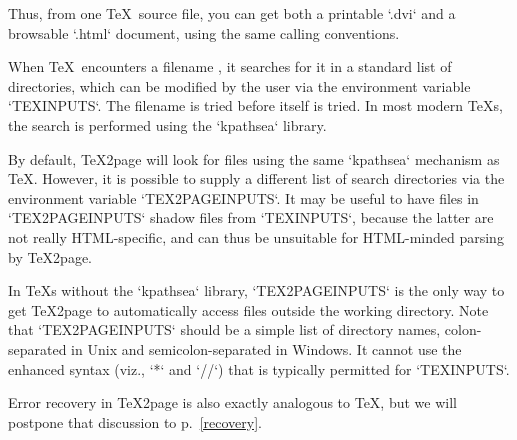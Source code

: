 Thus, from one \TeX\ source file, you can get both a printable `.dvi` and a
browsable `.html` document, using the same calling
conventions.\iffalse \f{Quite a few documents profit from
being available additionally as plain text, either as a man page, or as
tagged text on a general-purpose text editor, instead of requiring an HTML
browser.  The scripts `t2p2man`,
`t2p2txt`, and `t2p2info`, included in the \TeX2page distribution,
help accomplish this.
Each of these scripts takes as argument the main HTML
file \p{|meta[jobname].html} created by \TeX2page, and generate the
corresponding man page \p{|meta[jobname].1},
the Vim help file \p{|meta[jobname].txt}, and the
Info file
\p{|meta[jobname].info}
respectively.  While the man page is always a single page, the Info and
Vim-help output is composed of multiple files if the HTML document contains
pagebreaks.}\fi



When \TeX\ encounters a filename , it
searches for it
in a standard list of
directories, which can be modified by the user via the
environment variable `TEXINPUTS`.
The filename  is tried before
 itself is tried.  In most modern \TeX s, the
search is performed using the `kpathsea` library.

By default, \TeX2page will look for files using the same `kpathsea`
mechanism as \TeX.  However, it is possible to supply a
different list of search directories via the environment
variable `TEX2PAGEINPUTS`.
It may be useful to have
files in `TEX2PAGEINPUTS` shadow files from
`TEXINPUTS`, because the latter are not really
HTML-specific, and can thus be unsuitable for
HTML-minded parsing by \TeX2page.

In \TeX s without the `kpathsea` library,
`TEX2PAGEINPUTS` is the only way to get \TeX2page to
automatically access files outside the working
directory.  Note that `TEX2PAGEINPUTS` should be a
simple list of directory names, colon-separated in Unix
and semicolon-separated in Windows.  It cannot use the
enhanced syntax (viz., `*` and `//`) that is
typically permitted for `TEXINPUTS`.

%
Error recovery in \TeX2page is also exactly analogous to
\TeX, but we will postpone that discussion to
p.~\ref{recovery}.

